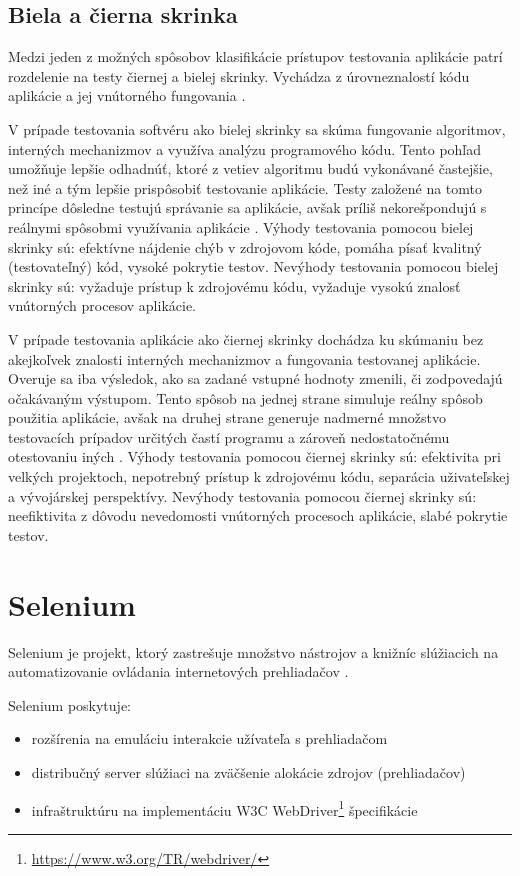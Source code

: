 \subsection{Biela a čierna skrinka}
Medzi jeden z možných spôsobov klasifikácie prístupov testovania aplikácie patrí rozdelenie na testy čiernej a bielej skrinky. Vychádza z úrovneznalostí kódu aplikácie a jej vnútorného fungovania \cite{thesis-automation-testing}.

V prípade testovania softvéru ako bielej skrinky sa skúma fungovanie algoritmov, interných mechanizmov a využíva analýzu programového kódu. Tento pohľad umožňuje lepšie odhadnúť, ktoré z vetiev algoritmu budú vykonávané častejšie, než iné a tým lepšie prispôsobiť testovanie aplikácie. Testy založené na tomto princípe dôsledne testujú správanie sa aplikácie,
avšak príliš nekorešpondujú s reálnymi spôsobmi využívania aplikácie \cite{box-testing}. Výhody testovania pomocou bielej skrinky sú: efektívne nájdenie chýb v zdrojovom kóde, pomáha písať kvalitný (testovateľný) kód, vysoké pokrytie testov. Nevýhody testovania pomocou bielej skrinky sú: vyžaduje prístup k zdrojovému kódu, vyžaduje vysokú znalosť vnútorných procesov aplikácie.

V prípade testovania aplikácie ako čiernej skrinky dochádza ku skúmaniu bez akejkoľvek znalosti interných mechanizmov a fungovania testovanej aplikácie. Overuje sa iba výsledok, ako sa zadané vstupné hodnoty zmenili, či zodpovedajú očakávaným výstupom. Tento spôsob na jednej strane simuluje reálny spôsob použitia aplikácie, avšak na druhej strane generuje nadmerné množstvo testovacích prípadov určitých častí programu a zároveň nedostatočnému otestovaniu iných \cite{thesis-automation-testing,box-testing}. Výhody testovania pomocou čiernej skrinky sú: efektivita pri velkých projektoch, nepotrebný prístup k zdrojovému kódu, separácia uživateľskej a vývojárskej perspektívy. Nevýhody testovania pomocou čiernej skrinky sú: neefiktivita z dôvodu nevedomosti vnútorných procesoch aplikácie, slabé pokrytie testov.
\section{Selenium}
Selenium je projekt, ktorý zastrešuje množstvo nástrojov a knižníc slúžiacich na automatizovanie ovládania internetových prehliadačov \cite{selenium-doc-new}.

\noindent Selenium poskytuje: 
\begin{itemize}
\item rozšírenia na emuláciu interakcie užívateľa s prehliadačom
\item distribučný server slúžiaci na zväčšenie alokácie zdrojov (prehliadačov)
\item infraštruktúru na implementáciu W3C WebDriver\footnote{\url{https://www.w3.org/TR/webdriver/}} špecifikácie
\end{itemize}
